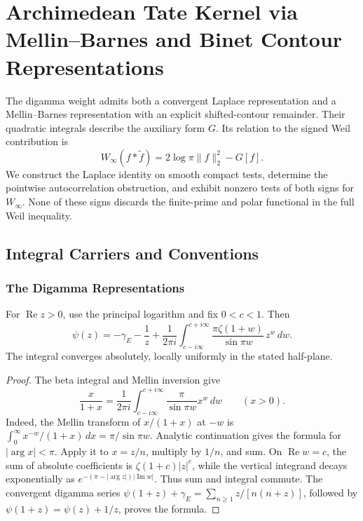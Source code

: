 \chapter{Archimedean Tate Kernel via Mellin--Barnes and Binet Contour Representations}
\label{v4-arith:w7-f:chapter}

The digamma weight admits both a convergent Laplace representation
and a Mellin--Barnes representation with an explicit shifted-contour
remainder. Their quadratic integrals describe the auxiliary form
\(G\). Its relation to the signed Weil contribution is
\[
 W_\infty(f*\widetilde f)=2\log\pi\|f\|_2^2-G[f].
\]
We construct the Laplace identity on smooth compact tests, determine
the pointwise autocorrelation obstruction, and exhibit nonzero tests
of both signs for \(W_\infty\). None of these signs discards the
finite-prime and polar functional in the full Weil inequality.

\section{Integral Carriers and Conventions}
\label{v4-arith:w7-f:context}
\subsection{The Digamma Representations}
\label{v4-arith:w7-f:context:representations}
\begin{proposition}
\label{v4-arith:w7-f:prop:mellin-barnes}
For \(\operatorname{Re}z>0\), use the principal logarithm and fix
\(0<c<1\). Then
\begin{equation}
\label{v4-arith:w7-f:eq:mellin-barnes}
 \psi(z)=-\gamma_E-\frac1z+
 \frac1{2\pi i}\int_{c-i\infty}^{c+i\infty}
       \frac{\pi\zeta(1+w)}{\sin\pi w}\,z^w\,dw .
\end{equation}
The integral converges absolutely, locally uniformly in the stated
half-plane.
\end{proposition}
\begin{proof}
The beta integral and Mellin inversion give
\[
 \frac{x}{1+x}=\frac1{2\pi i}\int_{c-i\infty}^{c+i\infty}
       \frac{\pi}{\sin\pi w}x^w\,dw\qquad(x>0).
\]
Indeed, the Mellin transform of \(x/(1+x)\) at \(-w\) is
\(\int_0^\infty x^{-w}/(1+x)\,dx=\pi/\sin\pi w\).
Analytic continuation gives the formula for \(|\arg x|<\pi\).
Apply it to \(x=z/n\), multiply by \(1/n\), and sum. On
\(\operatorname{Re}w=c\), the sum of absolute coefficients is
\(\zeta(1+c)|z|^c\), while the vertical integrand decays
exponentially as \(e^{-(\pi-|\arg z|)|\operatorname{Im}w|}\).
Thus sum and integral commute. The convergent digamma series
\(\psi(1+z)+\gamma_E=\sum_{n\ge1}z/[n(n+z)]\), followed by
\(\psi(1+z)=\psi(z)+1/z\), proves the formula.
\end{proof}

